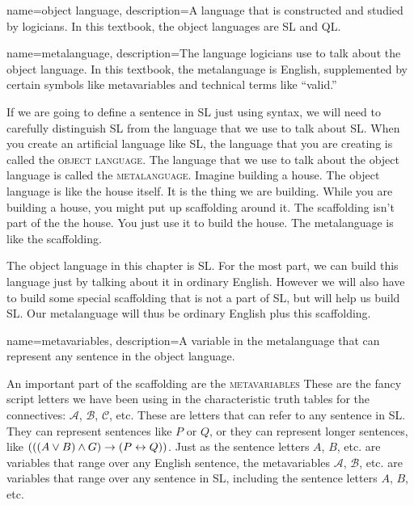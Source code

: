 {
name=object language,
description={A language that is constructed and studied by logicians. In this textbook, the object languages are SL and QL.
}


{
name=metalanguage,
description={The language logicians use to talk about the object language. In this textbook, the metalanguage is English, supplemented by certain symbols like metavariables and technical terms like ``valid.''}
}

If we are going to define a sentence in SL just using syntax, we will need to carefully distinguish SL from the language that we use to talk about SL. When you create an artificial language like SL, the language that you are creating is called the \textsc{\gls{object language}}. \label{def:object_language} The language that we use to talk about the object language is called the \textsc{\gls{metalanguage}}. \label{def:metalanguage} Imagine building a house. The object language is like the house itself. It is the thing we are building. While you are building a house, you might put up scaffolding around it. The scaffolding isn't part of the the house. You just use it to build the house. The metalanguage is like the scaffolding.

The object language in this chapter is SL. For the most part, we can build this language just by talking about it in ordinary English. However we will also have to build some special scaffolding that is not a part of SL, but will help us build SL. Our metalanguage will thus be ordinary English plus this scaffolding.

{
name=metavariables,
description={A variable in the metalanguage that can represent any sentence in the object language.}
}

An important part of the scaffolding are the \textsc{\gls{metavariables}} \label{def:metavariables} These are the fancy script letters we have been using in the characteristic truth tables for the connectives: $\mathcal{A}$, $\mathcal{B}$, $\mathcal{C}$, etc. These are letters that can refer to any sentence in SL. They can represent sentences like $P$ or $Q$, or they can represent longer sentences, like $(((A \lor B) \land G) \mathrel{\rightarrow} (P \mathrel{\leftrightarrow} Q))$.
Just as the sentence letters $A$, $B$, etc. are variables that range over any English sentence, the metavariables $\mathcal{A}$, $\mathcal{B}$, etc. are variables that range over any sentence in SL, including the sentence letters $A$, $B$, etc.

}

